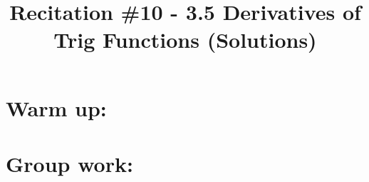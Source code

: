 \documentclass[nooutcomes]{ximera}
\title{Recitation \#10 - 3.5 Derivatives of Trig Functions (Solutions)}
\begin{document}
\begin{abstract}		\end{abstract}
\maketitle

\section*{Warm up:} 
	
	\begin{freeResponse}
	\end{freeResponse}	
	
	
	
	
	

\section*{Group work:}

\begin{problem}

			\begin{freeResponse}
			
			\end{freeResponse}
\end{problem}
	
	
	
	
			
			

\begin{problem}

		\begin{freeResponse}

		\end{freeResponse}
		
\end{problem}









\begin{problem}

		\begin{freeResponse}
		
		\end{freeResponse}
		
\end{problem}







\begin{problem}

		\begin{freeResponse}
		\end{freeResponse}
		



\end{problem}
	
	
	
	
	
	
	
	
	

	










								
				
				
	
\end{document}
